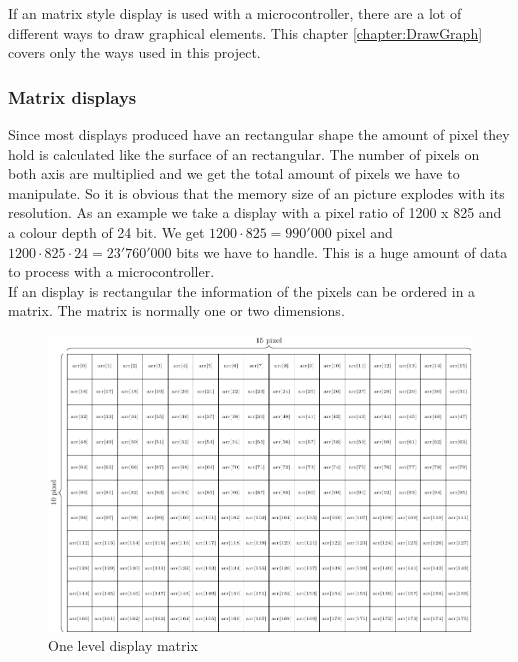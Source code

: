 
If an matrix style display is used with a microcontroller, there are a lot of different ways to draw graphical elements. This chapter \ref{chapter:DrawGraph} covers only the ways used in this project. 

\subsubsection{Matrix displays}

Since most displays produced have an rectangular shape the amount of pixel they hold is calculated like the surface of an rectangular. The number of pixels on both axis are multiplied and we get the total amount of pixels we have to manipulate. So it is obvious that the memory size of an picture explodes with its resolution. As an example we take a display with a pixel ratio of 1200 x 825 and a colour depth of 24 bit. We get $1200\cdot825=990'000$ pixel and $1200\cdot825\cdot24=23'760'000$ bits we have to handle. This is a huge amount of data to process with a microcontroller.\\
If an display is rectangular the information of the pixels can be ordered in a matrix. The matrix is normally one or two dimensions.  

\begin{figure}[H]
	\centering
	\includegraphics[width=1\textwidth]{2-theory/drawing-graphics/graphics/matrix.pdf}
	\caption{One level display matrix \label{theory:matrix}}
\end{figure}

